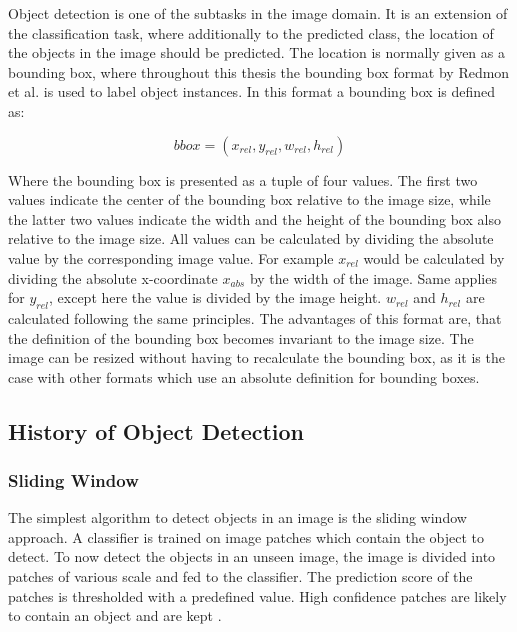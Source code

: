 \label{sec:object_detection}

Object detection is one of the subtasks in the image domain.
It is an extension of the classification task, where additionally to the predicted class, the location of the objects in the image should be predicted.
The location is normally given as a bounding box, where throughout this thesis the bounding box format by Redmon et al. \cite{yolov1} is used to label object instances.
In this format a bounding box is defined as:

\begin{equation}
    bbox = (x_{rel}, y_{rel}, w_{rel}, h_{rel})
\end{equation}

Where the bounding box is presented as a tuple of four values.
The first two values indicate the center of the bounding box relative to the image size, while the latter two values indicate the width and the height of the bounding box also relative to the image size.
All values can be calculated by dividing the absolute value by the corresponding image value.
For example $x_{rel}$ would be calculated by dividing the absolute x-coordinate $x_{abs}$ by the width of the image.
Same applies for $y_{rel}$, except here the value is divided by the image height.
$w_{rel}$ and $h_{rel}$ are calculated following the same principles.
The advantages of this format are, that the definition of the bounding box becomes invariant to the image size.
The image can be resized without having to recalculate the bounding box, as it is the case with other formats which use an absolute definition for bounding boxes.

\subsection{History of Object Detection}
\label{sec:hostory_obj_detection}

\subsubsection{Sliding Window}
The simplest algorithm to detect objects in an image is the sliding window approach.
A classifier is trained on image patches which contain the object to detect.
To now detect the objects in an unseen image, the image is divided into patches of various scale and fed to the classifier.
The prediction score of the patches is thresholded with a predefined value.
High confidence patches are likely to contain an object and are kept \cite{sliding_window_satelite}.

